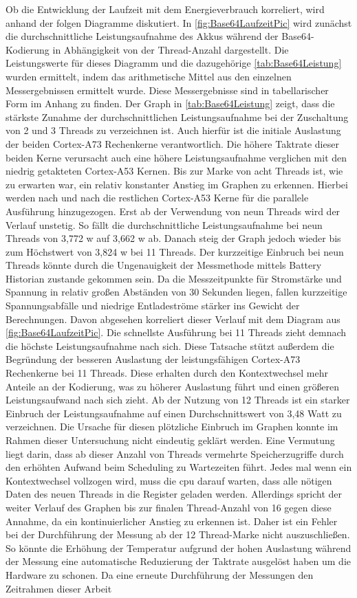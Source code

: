 Ob die Entwicklung der Laufzeit mit dem Energieverbrauch korreliert, wird anhand der folgen Diagramme diskutiert. In \autoref{fig:Base64LaufzeitPic} wird zunächst die durchschnittliche Leistungsaufnahme des Akkus während der Base64-Kodierung in Abhängigkeit von der Thread-Anzahl dargestellt. Die Leistungswerte für dieses Diagramm  und die dazugehörige \autoref{tab:Base64Leistung} wurden ermittelt, indem das arithmetische Mittel aus den einzelnen Messergebnissen ermittelt wurde. Diese Messergebnisse sind in tabellarischer Form im Anhang zu finden. Der Graph in \autoref{tab:Base64Leistung} zeigt, dass die stärkste Zunahme der durchschnittlichen Leistungsaufnahme bei der Zuschaltung von 2 und 3 Threads zu verzeichnen ist. Auch hierfür ist die initiale Auslastung der beiden Cortex-A73 Rechenkerne verantwortlich. Die höhere Taktrate dieser beiden Kerne verursacht auch eine höhere Leistungsaufnahme verglichen mit den niedrig getakteten Cortex-A53 Kernen. Bis zur Marke von acht Threads ist, wie zu erwarten war, ein relativ konstanter Anstieg im Graphen zu erkennen. Hierbei werden nach und nach die restlichen Cortex-A53 Kerne für die parallele Ausführung hinzugezogen. Erst ab der Verwendung von neun Threads wird der Verlauf unstetig. So fällt die durchschnittliche Leistungsaufnahme bei neun Threads von 3,772 \ac{w} auf 3,662 \ac{w} ab. Danach steig der Graph jedoch wieder bis zum Höchstwert von 3,824 \ac{w} bei 11 Threads. Der kurzzeitige Einbruch bei neun Threads könnte durch die  Ungenauigkeit der Messmethode mittels Battery Historian zustande gekommen sein. Da die Messzeitpunkte für Stromstärke und Spannung in relativ großen Abständen von 30 Sekunden liegen, fallen kurzzeitige Spannungsabfälle und niedrige Entladeströme stärker ins Gewicht der Berechnungen. Davon abgesehen korreliert dieser Verlauf mit dem Diagram aus \autoref{fig:Base64LaufzeitPic}. Die schnellste Ausführung bei 11 Threads zieht demnach die höchste Leistungsaufnahme nach sich. Diese Tatsache stützt außerdem die Begründung der besseren Auslastung der leistungsfähigen Cortex-A73 Rechenkerne bei 11 Threads. Diese erhalten durch den Kontextwechsel mehr Anteile an der Kodierung, was zu höherer Auslastung führt und einen größeren Leistungsaufwand nach sich zieht. Ab der Nutzung von 12 Threads ist ein starker Einbruch der Leistungsaufnahme auf einen Durchschnittswert von 3,48 Watt zu verzeichnen. Die Ursache für diesen plötzliche Einbruch im Graphen konnte im Rahmen dieser Untersuchung nicht eindeutig geklärt werden. Eine Vermutung liegt darin, dass ab dieser Anzahl von Threads vermehrte Speicherzugriffe durch den erhöhten Aufwand beim Scheduling zu Wartezeiten führt. Jedes mal wenn ein Kontextwechsel vollzogen wird, muss die \ac{cpu} darauf warten, dass alle nötigen Daten des neuen Threads in die Register geladen werden. Allerdings spricht der weiter Verlauf des Graphen bis zur finalen Thread-Anzahl von 16 gegen diese Annahme, da ein kontinuierlicher Anstieg zu erkennen ist. Daher ist ein Fehler bei der Durchführung der Messung ab der 12 Thread-Marke nicht auszuschließen. So könnte die Erhöhung der Temperatur aufgrund der hohen Auslastung während der Messung eine automatische Reduzierung der Taktrate ausgelöst haben um die Hardware zu schonen. Da eine erneute Durchführung der Messungen den Zeitrahmen dieser Arbeit 